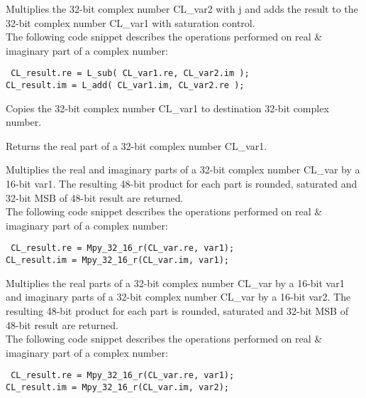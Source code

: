 Multiplies the 32-bit complex number CL\_var2 with j and adds the result to the 32-bit complex number CL\_var1 with saturation control.\\
The following code snippet describes the operations performed on real \& imaginary part of a complex number:

{\tt {} CL\_result.re = L\_sub( CL\_var1.re, CL\_var2.im );\\
      CL\_result.im = L\_add( CL\_var1.im, CL\_var2.re );
}


Copies the 32-bit complex number CL\_var1 to destination 32-bit complex number.


Returns the real part of a 32-bit complex number CL\_var1.


Multiplies the real and imaginary parts of a 32-bit complex number CL\_var by a 16-bit var1.
The resulting 48-bit product for each part is rounded, saturated and 32-bit MSB of 48-bit result are returned.\\
The following code snippet describes the operations performed on real \& imaginary part of a complex number:

{\tt {} CL\_result.re = Mpy\_32\_16\_r(CL\_var.re, var1);\\
      CL\_result.im = Mpy\_32\_16\_r(CL\_var.im, var1);
}


Multiplies the real parts of a 32-bit complex number CL\_var by a 16-bit var1 and imaginary parts of a 32-bit complex number CL\_var by a 16-bit var2.
The resulting 48-bit product for each part is rounded, saturated and 32-bit MSB of 48-bit result are returned.\\
The following code snippet describes the operations performed on real \& imaginary part of a complex number:

{\tt {} CL\_result.re = Mpy\_32\_16\_r(CL\_var.re, var1);\\
      CL\_result.im = Mpy\_32\_16\_r(CL\_var.im, var2);
}

